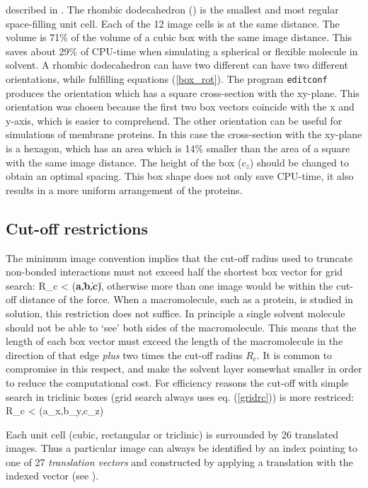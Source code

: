 described in .
The rhombic dodecahedron () is the smallest and most regular
space-filling unit cell. Each of the 12 image cells is at the same distance.
The volume is 71\% of the volume of a cubic box with the same image
distance. This saves about 29\% of CPU-time when simulating a spherical or
flexible molecule in solvent.
A rhombic dodecahedron can have two different can have two different
orientations, while fulfilling equations (\ref{box_rot}).
The program {\tt editconf} produces the orientation which has a square
cross-section with the xy-plane.
This orientation was chosen because the first two box vectors coincide with the
x and y-axis, which is easier to comprehend. The other orientation can be
useful for simulations of membrane proteins. In this case the cross-section
with the xy-plane is a hexagon, which has an area which is 14\% smaller than
the area of a square with the same image distance.
The height of the box ($c_z$) should be changed to obtain an optimal spacing.
This box shape does not only save CPU-time,
it also results in a more uniform arrangement of the proteins.

\subsection{Cut-off restrictions}
The minimum image convention implies that the cut-off radius used to
truncate non-bonded interactions must not exceed half the shortest box
vector for grid search:
\beq
\label{gridrc}
  R_c < \half \min(\|{\bf a}\|,\|{\bf b}\|,\|{\bf c}\|),
\eeq
otherwise more than one image would be within the cut-off distance of
the force. When a macromolecule, such as a protein, is studied in
solution,  this restriction does not suffice. In principle a single
solvent  molecule should not be able
to `see' both sides of the macromolecule. This means that the length of
each box vector must exceed the length of the macromolecule in the
direction of that edge {\em plus} two times the cut-off radius $R_c$.
It is common to compromise in this respect, and make the solvent layer
somewhat smaller in order to reduce the computational cost.
For efficiency reasons the cut-off with simple search in triclinic boxes
(grid search always uses eq. (\ref{gridrc})) is more restriced:
\beq
\label{simplerc}
R_c < \half \min(a_x,b_y,c_z)
\eeq

Each unit cell (cubic, rectangular or triclinic)
is surrounded by 26 translated images. Thus a
particular image can always be identified by an index pointing to one
of 27 {\em translation vectors} and constructed by applying a
translation with the indexed vector (see ).


